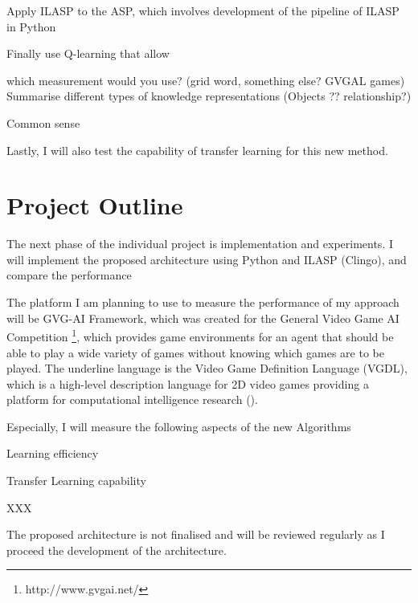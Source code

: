 \documentclass[12pt,twoside]{report}
\begin{document}
Apply ILASP to the ASP, which involves development of the pipeline of ILASP in Python

Finally use Q-learning that allow

which measurement would you use? (grid word, something else? GVGAL games)
Summarise different types of knowledge representations (Objects ?? relationship?)

Common sense

Lastly, I will also test the capability of transfer learning for this new method.

\section{Project Outline}

The next phase of the individual project is implementation and experiments. I will implement the proposed architecture using Python and ILASP (Clingo), and compare the performance

The platform I am planning to use to measure the performance of my approach will be GVG-AI Framework, which was created for the General Video Game AI Competition \footnote{http://www.gvgai.net/}, which provides game environments for an agent that should be able to play a wide variety of games without knowing which games are to be played.
The underline language is the Video Game Definition Language (VGDL), which is a high-level description language for 2D video games providing a platform for computational intelligence research (\cite{Schaul2013}).

Especially, I will measure the following aspects of the new Algorithms

Learning efficiency

Transfer Learning capability

XXX


The proposed architecture is not finalised and will be reviewed regularly as I proceed the development of the architecture.

%
%
\end{document}
